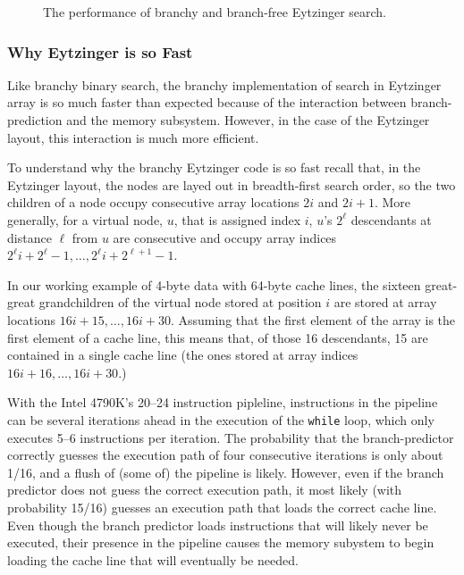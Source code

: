 \documentclass{patmorin}
\begin{document}
\begin{figure}
   \caption{The performance of branchy and branch-free Eytzinger search.}
\end{figure}

\subsubsection{Why Eytzinger is so Fast}

Like branchy binary search, the branchy implementation of search in
Eytzinger array is so much faster than expected because of the interaction
between branch-prediction and the memory subsystem.  However, in the
case of the Eytzinger layout, this interaction is much more efficient.

To understand why the branchy Eytzinger code is so fast recall that,
in the Eytzinger layout, the nodes are layed out in breadth-first
search order,  so the two children of a node occupy consecutive array
locations $2i$ and $2i+1$. More generally, for a virtual node, $u$,
that is assigned index $i$, $u$'s $2^\ell$ descendants at distance
$\ell$ from $u$ are consecutive and occupy array indices $2^\ell i +
2^{\ell}-1,\ldots,2^{\ell} i + 2^{\ell+1}-1$.

In our working example of 4-byte data with 64-byte cache lines, the
sixteen great-great grandchildren of the virtual node stored at position
$i$ are stored at array locations $16i+15,\ldots,16i+30$.  Assuming that
the first element of the array is the first element of a cache line,
this means that, of those 16 descendants, 15 are contained in a single
cache line (the ones stored at array indices $16i+16,\ldots,16i+30$.)

With the Intel 4790K's 20--24 instruction pipleline, instructions in
the pipeline can be several iterations ahead in the execution of the
\texttt{while} loop, which only executes 5--6 instructions per
iteration.  The probability that the branch-predictor correctly guesses
the execution path of four consecutive iterations is only about 1/16,
and a flush of (some of) the pipeline is likely.  However, even if the
branch predictor does not guess the correct execution path, it most likely
(with probability 15/16) guesses an execution path that loads the correct
cache line.  Even though the branch predictor loads instructions that will
likely never be executed, their presence in the pipeline causes the memory
subystem to begin loading the cache line that will eventually be needed.
\end{document}
